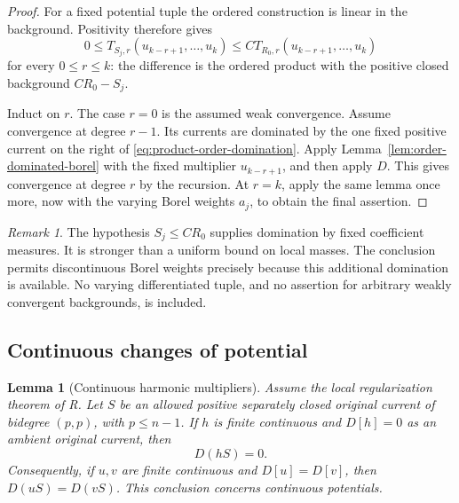 \documentclass[11pt,a4paper]{article}
\numberwithin{equation}{section}
\newtheorem{lemma}[theorem]{Lemma}
\theoremstyle{definition}
\theoremstyle{remark}
\newtheorem{remark}[theorem]{Remark}
\begin{document}
\begin{proof}
For a fixed potential tuple the ordered construction is linear in
the background. Positivity therefore gives
\begin{equation}\label{eq:product-order-domination}
 0\leq T_{S_j,r}(u_{k-r+1},\ldots,u_k)
 \leq C T_{R_0,r}(u_{k-r+1},\ldots,u_k)
\end{equation}
for every $0\leq r\leq k$: the difference is the ordered product
with the positive closed background $CR_0-S_j$.

Induct on $r$. The case $r=0$ is the assumed weak convergence.
Assume convergence at degree $r-1$. Its currents are dominated by
the one fixed positive current on the right of
\eqref{eq:product-order-domination}. Apply
Lemma~\ref{lem:order-dominated-borel} with the fixed multiplier
$u_{k-r+1}$, and then apply $D$. This gives convergence at degree
$r$ by the recursion. At $r=k$, apply the same lemma once more,
now with the varying Borel weights $a_j$, to obtain the final
assertion.
\end{proof}

\begin{remark}
The hypothesis $S_j\leq CR_0$ supplies domination by fixed coefficient
measures. It is stronger than a uniform bound on local masses.
The conclusion permits discontinuous Borel weights precisely because
this additional domination is available. No varying differentiated
tuple, and no assertion for arbitrary weakly convergent backgrounds,
is included.
\end{remark}

\subsection{Continuous changes of potential}

\begin{lemma}[Continuous harmonic multipliers]
\label{lem:continuous-harmonic-multipliers}
Assume the local regularization theorem of \textup{R}. Let $S$ be an
allowed positive separately closed original current of bidegree
$(p,p)$, with $p\leq n-1$. If $h$ is finite continuous and
$D[h]=0$ as an ambient original current, then
\[
 D(hS)=0.
\]
Consequently, if $u,v$ are finite continuous and $D[u]=D[v]$, then
$D(uS)=D(vS)$. This conclusion concerns continuous potentials.
\end{lemma}
\end{document}
